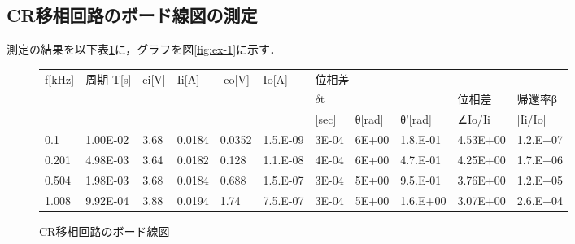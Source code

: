 \documentclass[10pt, a4j, dvipdfmx]{jarticle}
\makeatletter
\newcommand{\tblcaption}[1]{\def\@captype{table}\caption{#1}}
\makeatother
\begin{document}
    \subsection{CR移相回路のボード線図の測定}
    測定の結果を以下表\ref{tbl:1}に，グラフを図\ref{fig:ex-1}に示す．
        \small
        \begin{figure}[H]
            \centering
            \tblcaption{CR移相回路のボード線図}
            \label{tbl:1}
            \begin{tabular}{|l|l|l|l|l|l|l|l|l|l|l|}
            \hline
            \multirow{3}{*}{f{[}kHz{]}} & \multirow{3}{*}{周期 T{[}s{]}} & \multirow{3}{*}{ei{[}V{]}} & \multirow{3}{*}{Ii{[}A{]}} & \multirow{3}{*}{-eo{[}V{]}} & \multirow{3}{*}{Io{[}A{]}} & \multicolumn{3}{l|}{位相差}             &          &          \\ \cline{7-11} 
                                        &                              &                            &                            &                             &                            & \multicolumn{3}{l|}{$\delta$t}              & 位相差      & 帰還率β     \\ \cline{7-11} 
                                        &                              &                            &                            &                             &                            & {[}sec{]} & θ{[}rad{]} & θ'{[}rad{]} & ∠Io/Ii   & |Ii/Io|  \\ \hline
            0.1                         & 1.00E-02                     & 3.68                       & 0.0184                     & 0.0352                      & 1.5.E-09                   & 3E-04     & 6E+00      & 1.8.E-01    & 4.53E+00 & 1.2.E+07 \\ \hline
            0.201                       & 4.98E-03                     & 3.64                       & 0.0182                     & 0.128                       & 1.1.E-08                   & 4E-04     & 6E+00      & 4.7.E-01    & 4.25E+00 & 1.7.E+06 \\ \hline
            0.504                       & 1.98E-03                     & 3.68                       & 0.0184                     & 0.688                       & 1.5.E-07                   & 3E-04     & 5E+00      & 9.5.E-01    & 3.76E+00 & 1.2.E+05 \\ \hline
            1.008                       & 9.92E-04                     & 3.88                       & 0.0194                     & 1.74                        & 7.5.E-07                   & 3E-04     & 5E+00      & 1.6.E+00    & 3.07E+00 & 2.6.E+04 \\ \hline

\end{tabular}
\end{figure}
\end{document}
